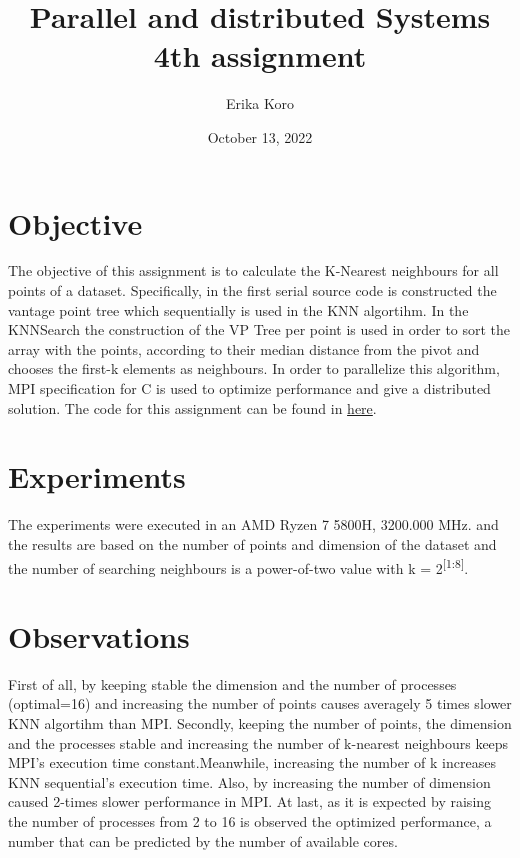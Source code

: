 \documentclass[12pt, a4paper]{report}
\title{\quad Parallel and distributed Systems 
        \newline 4th assignment}
\author{Erika Koro}
\date{October 13, 2022}
\begin{document}
    \maketitle

    \newpage 
    \section*{Objective}

    The objective of this assignment is to calculate the K-Nearest neighbours for all points of 
    a dataset. Specifically, in the first serial source code is constructed the vantage point
    tree which sequentially is used in the KNN algortihm. In the KNNSearch the construction of the
    VP Tree per point is used in order to sort the array with the points, according to their median distance
    from the pivot and chooses the first-k elements as neighbours.
    In order to parallelize this algorithm, MPI specification for C is used to optimize performance
    and give a distributed solution. The code for this assignment can be found
    in \href{https://github.com/ErikaKoro/PDS4}{here}.



    \section*{Experiments}
    
    The experiments were executed in an AMD Ryzen 7 5800H, 3200.000 MHz.
    and the results are based on the number of points and dimension of the dataset and the 
    number of searching neighbours is a power-of-two value with k = 2\textsuperscript{[1:8]}. 


    \section*{Observations}

    First of all, by keeping stable the dimension and the number of processes (optimal=16) and increasing the
    number of points causes averagely 5 times slower KNN algortihm than MPI. Secondly, keeping the number of
    points, the dimension and the processes stable and increasing the number of k-nearest neighbours keeps MPI's
    execution time constant.Meanwhile, increasing the number of k increases KNN sequential's execution time. Also,
    by increasing the number of dimension caused 2-times slower performance in MPI. At last, as it is expected by raising the number of processes from 2 to 16 is observed the optimized
    performance, a number that can be predicted by the number of available cores. 
\end{document}
